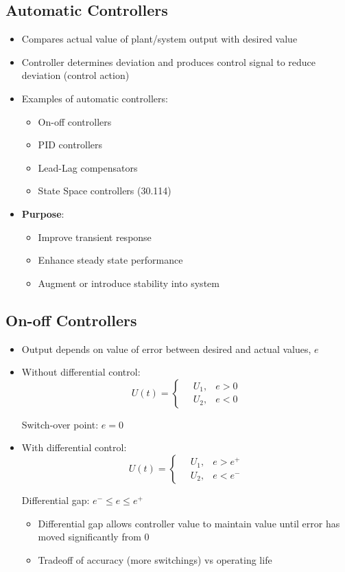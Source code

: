 \documentclass[a4paper]{article}
\begin{document}
\subsection{Automatic Controllers}
\begin{itemize}
    \item Compares actual value of plant/system output with desired value
    \item Controller determines deviation and produces control signal to reduce deviation (control action)
    \item Examples of automatic controllers:
    \begin{itemize}[label=$\circ$]
        \item On-off controllers
        \item PID controllers
        \item Lead-Lag compensators
        \item State Space controllers (30.114)
    \end{itemize}
    \item \textbf{Purpose}: 
    \begin{itemize}[label=$\circ$]
        \item Improve transient response
        \item Enhance steady state performance
        \item Augment or introduce stability into system
    \end{itemize}
\end{itemize}

\subsection{On-off Controllers}
\begin{itemize}
    \item Output depends on value of error between desired and actual values, $e$
    \item Without differential control:
    $$U(t) = \begin{cases}
    \quad U_1, & e>0\\
    \quad U_2, & e<0
    \end{cases}$$
    \begin{center}
        Switch-over point: $e=0$
    \end{center}
    \item With differential control:
    $$U(t) = \begin{cases}
    \quad U_1, & e>e^+\\
    \quad U_2, & e<e^-
    \end{cases}$$
    \begin{center}
        Differential gap: $e^-\leq e \leq e^+$
    \end{center}
    \begin{itemize}[label=$\circ$]
        \item Differential gap allows controller value to maintain value until error has moved significantly from 0 
        \item Tradeoff of accuracy (more switchings) vs operating life
    \end{itemize}
\end{itemize}
\end{document}
